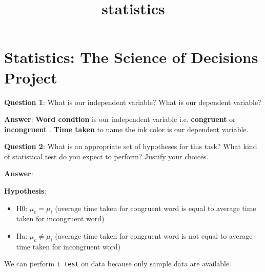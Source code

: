 \documentclass[11pt]{article}
\title{statistics}
\providecommand{\tightlist}{%
      \setlength{\itemsep}{0pt}\setlength{\parskip}{0pt}}
\begin{document}
    
    
    \maketitle
    
    

    
    \section{Statistics: The Science of Decisions
Project}\label{statistics-the-science-of-decisions-project}

    \textbf{Question 1}: What is our independent variable? What is our
dependent variable?

    \textbf{Answer}: \textbf{Word condtion} is our independent variable i.e.
\textbf{congruent} or \textbf{incongruent }. \textbf{Time taken} to name
the ink color is our dependent variable.

    \textbf{Question 2}: What is an appropriate set of hypotheses for this
task? What kind of statistical test do you expect to perform? Justify
your choices.

    \textbf{Answer}:

\textbf{Hypothesis}:

\begin{itemize}
\tightlist
\item
  H0: \(\mu_c = \mu_i\) (average time taken for congruent word is equal
  to average time taken for incongruent word)
\item
  Ha: \(\mu_c \neq \mu_i\) (average time taken for congruent word is not
  equal to average time taken for incongruent word)
\end{itemize}

We can perform \texttt{t\ test} on data because only sample data are
available.
\end{document}
